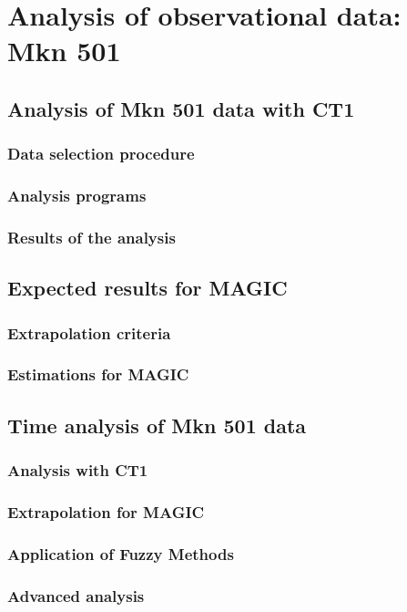 

\chapter{Analysis of observational data: Mkn 501}
\label{chapter:mkn501}

\section{Analysis of Mkn 501 data with CT1}

\subsection{Data selection procedure}

\subsection{Analysis programs}

\subsection{Results of the analysis}

\section{Expected results for MAGIC}

\subsection{Extrapolation criteria}

\subsection{Estimations for MAGIC}

\section{Time analysis of Mkn 501 data}

\subsection{Analysis with CT1}

\subsection{Extrapolation for MAGIC}

\subsection{Application of Fuzzy Methods}

\subsection{Advanced analysis}

\endinput
%

